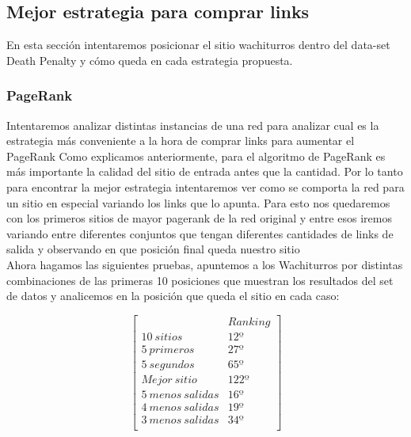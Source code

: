 
\subsection{Mejor estrategia para comprar links}

En esta sección intentaremos posicionar el sitio wachiturros dentro del data-set Death Penalty y cómo queda en cada 
estrategia propuesta.

\subsubsection{PageRank}

Intentaremos analizar distintas instancias de una red para analizar cual es la estrategia más conveniente a la hora de comprar links para aumentar el PageRank 
Como explicamos anteriormente, para el algoritmo de PageRank es más importante la calidad del sitio de entrada antes que la cantidad. Por lo tanto para encontrar la mejor estrategia intentaremos ver como se comporta la red para un sitio en especial variando los links que lo apunta. Para esto nos quedaremos con los primeros sitios de mayor pagerank de la red original y entre esos iremos variando entre diferentes conjuntos que tengan diferentes cantidades de links de salida y observando en que posición final queda nuestro sitio \\

Ahora hagamos las siguientes pruebas, apuntemos a los Wachiturros por distintas combinaciones de las primeras 10 posiciones que muestran los resultados del set de datos y analicemos en la posición que queda el sitio en cada caso:

   $$ 
\begin{bmatrix}
              		&      Ranking \\
 10\ sitios 		&   	12º        \\
 5\ primeros   		&     	27º   \\
 5\ segundos   		&      	65º 	\\
 Mejor\ sitio   		&        122º    \\
 5\ menos\ salidas  	&        16º     \\
 4\ menos\ salidas  	&        19º  \\
 3\ menos\ salidas   	&     	34º \\
\end{bmatrix} 
$$

